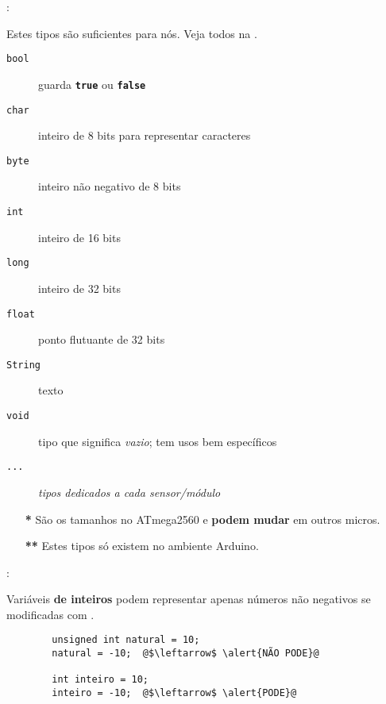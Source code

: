 \begin{frame}{\insertsection: \insertsubsection}

	Estes tipos são suficientes para nós. Veja todos na .

	\begin{description}
		\item[\texttt{bool}] guarda \textbf{\texttt{true}} ou \textbf{\texttt{false}}
		\item[\texttt{char}] inteiro de 8 bits para representar caracteres
		\item[\texttt{byte}] inteiro não negativo de 8 bits\Highlight{**}
		\item[\texttt{int}] inteiro de 16 bits\Highlight{*}
		\item[\texttt{long}] inteiro de 32 bits\Highlight{*}
		\item[\texttt{float}] ponto flutuante de 32 bits
		\item[\texttt{String}] texto\Highlight{**}
		\item[\texttt{void}] tipo que significa \emph{vazio}; tem usos bem específicos
		\item[\texttt{...}] \emph{tipos dedicados a cada sensor/módulo}
	\end{description}

	\vfill
	\begin{itemize}
		\item[\textbf{*}] São os tamanhos no ATmega2560 e \textbf{podem mudar} em outros micros.
		\item[\textbf{**}] Estes tipos só existem no ambiente Arduino.
	\end{itemize}

\end{frame}


\begin{frame}[fragile]{\insertsection: \insertsubsection}

	Variáveis \textbf{de inteiros} podem representar apenas números não negativos se modificadas com \texttt{}.
	\begin{verbatim}
		unsigned int natural = 10;
		natural = -10;  @$\leftarrow$ \alert{NÃO PODE}@

		int inteiro = 10;
		inteiro = -10;  @$\leftarrow$ \alert{PODE}@
	\end{verbatim}

\end{frame}


